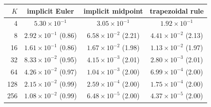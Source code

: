 \begin{tabular}{rccc}
\toprule
$K$ & implicit Euler & implicit midpoint & trapezoidal rule\\
\midrule
4 & $5.30\times10^{-1}$ & $3.05\times10^{-1}$ & $1.92\times10^{-1}$\\
8 & $2.92\times10^{-1}$ (0.86) & $6.58\times10^{-2}$ (2.21) & $4.41\times10^{-2}$ (2.13)\\
16 & $1.61\times10^{-1}$ (0.86) & $1.67\times10^{-2}$ (1.98) & $1.13\times10^{-2}$ (1.97)\\
32 & $8.33\times10^{-2}$ (0.95) & $4.15\times10^{-3}$ (2.01) & $2.80\times10^{-3}$ (2.01)\\
64 & $4.26\times10^{-2}$ (0.97) & $1.04\times10^{-3}$ (2.00) & $6.99\times10^{-4}$ (2.00)\\
128 & $2.15\times10^{-2}$ (0.99) & $2.59\times10^{-4}$ (2.00) & $1.75\times10^{-4}$ (2.00)\\
256 & $1.08\times10^{-2}$ (0.99) & $6.48\times10^{-5}$ (2.00) & $4.37\times10^{-5}$ (2.00)\\
\bottomrule
\end{tabular}
